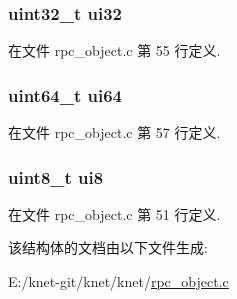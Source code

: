 \hypertarget{struct__krpc__number__t_afff306e5acf0ea66d28aa5fba332dd51}{}
\subsubsection[{ui32}]{\setlength{\rightskip}{0pt plus 5cm}uint32\+\_\+t ui32}\label{struct__krpc__number__t_afff306e5acf0ea66d28aa5fba332dd51}


在文件 rpc\+\_\+object.\+c 第 55 行定义.

\hypertarget{struct__krpc__number__t_a484c3360d4ca13775ab9560ac9e1484c}{}
\subsubsection[{ui64}]{\setlength{\rightskip}{0pt plus 5cm}uint64\+\_\+t ui64}\label{struct__krpc__number__t_a484c3360d4ca13775ab9560ac9e1484c}


在文件 rpc\+\_\+object.\+c 第 57 行定义.

\hypertarget{struct__krpc__number__t_ab85917650ffc409eede015fc3b83a054}{}
\subsubsection[{ui8}]{\setlength{\rightskip}{0pt plus 5cm}uint8\+\_\+t ui8}\label{struct__krpc__number__t_ab85917650ffc409eede015fc3b83a054}


在文件 rpc\+\_\+object.\+c 第 51 行定义.



该结构体的文档由以下文件生成\+:\begin{DoxyCompactItemize}
\item 
E\+:/knet-\/git/knet/knet/\hyperlink{rpc__object_8c}{rpc\+\_\+object.\+c}\end{DoxyCompactItemize}
